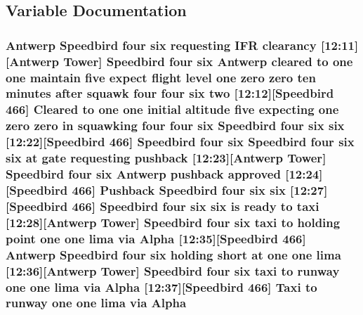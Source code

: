 \subsection{Variable Documentation}
\subsubsection[{\texorpdfstring{Alpha}{Alpha}}]{\setlength{\rightskip}{0pt plus 5cm}Antwerp Speedbird four {\bf six} requesting I\+FR clearancy \mbox{[}12\+:11\mbox{]}\mbox{[}Antwerp {\bf Tower}\mbox{]} Speedbird four {\bf six} Antwerp cleared to {\bf one} {\bf one} maintain five expect flight level {\bf one} {\bf zero} {\bf zero} {\bf ten} minutes after squawk four four {\bf six} {\bf two} \mbox{[}12\+:12\mbox{]}\mbox{[}Speedbird 466\mbox{]} Cleared to {\bf one} {\bf one} initial altitude five expecting {\bf one} {\bf zero} {\bf zero} in {\bf squawking} four four {\bf six} Speedbird four {\bf six} {\bf six} \mbox{[}12\+:22\mbox{]}\mbox{[}Speedbird 466\mbox{]} Speedbird four {\bf six} Speedbird four {\bf six} {\bf six} at gate requesting pushback \mbox{[}12\+:23\mbox{]}\mbox{[}Antwerp {\bf Tower}\mbox{]} Speedbird four {\bf six} Antwerp pushback {\bf approved} \mbox{[}12\+:24\mbox{]}\mbox{[}Speedbird 466\mbox{]} Pushback Speedbird four {\bf six} {\bf six} \mbox{[}12\+:27\mbox{]}\mbox{[}Speedbird 466\mbox{]} Speedbird four {\bf six} {\bf six} is ready to taxi \mbox{[}12\+:28\mbox{]}\mbox{[}Antwerp {\bf Tower}\mbox{]} Speedbird four {\bf six} taxi to holding point {\bf one} {\bf one} {\bf lima} via Alpha \mbox{[}12\+:35\mbox{]}\mbox{[}Speedbird 466\mbox{]} Antwerp Speedbird four {\bf six} holding short at {\bf one} {\bf one} {\bf lima} \mbox{[}12\+:36\mbox{]}\mbox{[}Antwerp {\bf Tower}\mbox{]} Speedbird four {\bf six} taxi to runway {\bf one} {\bf one} {\bf lima} via Alpha \mbox{[}12\+:37\mbox{]}\mbox{[}Speedbird 466\mbox{]} Taxi to runway {\bf one} {\bf one} {\bf lima} via Alpha}\hypertarget{ATC_8txt_a1776853b9ca88c0d192ef355be254452}{}\label{ATC_8txt_a1776853b9ca88c0d192ef355be254452}
